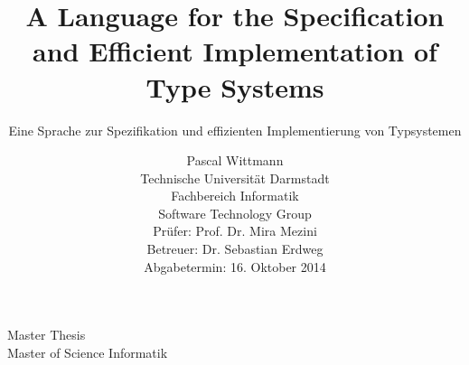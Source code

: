 \begin{center}
  Master Thesis \\
  Master of Science Informatik
\end{center}

\title{A Language for the Specification and Efficient Implementation
  of Type Systems}
\subtitle{Eine Sprache zur Spezifikation und effizienten
  Implementierung von Typsystemen}
\author{
Pascal Wittmann \\[6cm]
\small Technische Universität Darmstadt \\
\small Fachbereich Informatik \\
\small Software Technology Group \\[0.5cm]
\small Prüfer: Prof. Dr. Mira Mezini \\
\small Betreuer: Dr. Sebastian Erdweg \\[0.5cm]
\small Abgabetermin: 16. Oktober 2014
}
\date{} %

\begingroup\ 
\let\newpage\relax %
\maketitle
\endgroup

\clearpage
\thispagestyle{empty}
\mbox{}

